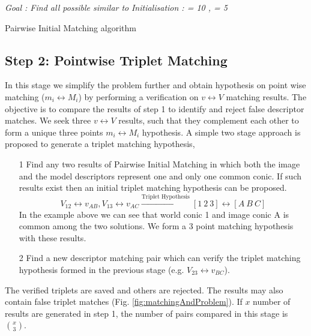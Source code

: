 \documentclass{bmvc2k}
\begin{document}
\begin{algorithm} \label{algo:PIM}
\emph{Goal : Find all possible \threeDFv similar to \twoDFv} \;
\emph{Initialisation : \ThresholdD = 10 , \ThresholdA = 5} \; 
\caption{Pairwise Initial Matching algorithm}
\end{algorithm}

\subsection{Step 2: Pointwise Triplet Matching}
In this stage we simplify the problem further and obtain hypothesis on point wise matching ($ m_i \leftrightarrow M_i $) by performing a verification on $ v \leftrightarrow V $ matching results. 
The objective is to compare the results of step 1 to identify and reject false descriptor matches. 
We seek three $ v \leftrightarrow V $ results, such that they complement each other to form a unique three points $ m_i \leftrightarrow M_i $ hypothesis.
A simple two stage approach is proposed to generate a triplet matching hypothesis,
\begin{enumerate}
\item[1] Find any two results of Pairwise Initial Matching in which both the image and the model descriptors represent one and only one common conic. If such results exist then an initial triplet matching hypothesis can be proposed. 
\[
 V_{12} \leftrightarrow v_{AB},V_{13} \leftrightarrow v_{AC } \xrightarrow{\text{Triplet Hypothesis}} [1~2~3] \leftrightarrow [A~B~ C]
\]
In the example above we can see that world conic 1 and image conic A is common among the two solutions. We form a 3 point matching hypothesis with these results. 
\item[2] Find a new descriptor matching pair which can verify the triplet matching hypothesis formed in the previous stage (e.g. $ V_{23} \leftrightarrow v_{BC}$).
\end{enumerate}
The verified triplets are saved and others are rejected. 
The results may also contain false triplet matches (Fig. \ref{fig:matchingAndProblem}). 
If $ x $ number of results are generated in step 1, the number of pairs compared in this stage is $ \binom{x}{3} $. 
\end{document}
